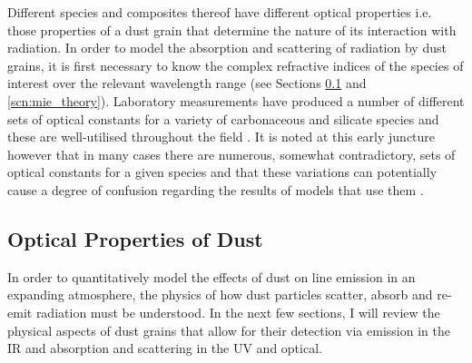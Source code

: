 Different species and composites thereof have different optical properties i.e. those properties of a dust grain that determine the nature of its interaction with radiation.  In order to model the absorption and scattering of radiation by dust grains, it is first necessary to know the complex refractive indices of the species of interest over the relevant wavelength range (see Sections \ref{opt_prop} and \ref{scn:mie_theory}).  Laboratory measurements have produced a number of different sets of optical constants for a variety of carbonaceous and silicate species and these are well-utilised throughout the field \citep{Draine1984,Zubko1996,Jager2003}.  It is noted at this early juncture however that in many cases there are numerous, somewhat contradictory, sets of optical constants for a given species and that these variations can potentially cause a degree of confusion regarding the results of models that use them \citep{Owen2015}.  
%



\subsection{Optical Properties of Dust}
\label{opt_prop}


In order to quantitatively model the effects of dust on line emission in an expanding atmosphere, the physics of how dust particles scatter, absorb and re-emit radiation must be understood. In the next few sections, I will review the physical aspects of dust grains that allow for their detection via emission in the IR and absorption and scattering in the UV and optical.   


